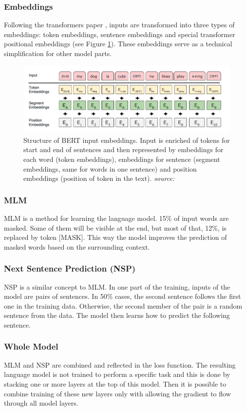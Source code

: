 \subsubsection{Embeddings}
Following the transformers paper \cite{vaswani1706attention},
inputs are transformed into three types of embeddings: token embeddings, sentence embeddings and special transformer positional embeddings (see Figure \ref{fig:bert_emb}). These embeddings serve as a technical simplification for other model parts.

\begin{figure}[H]
\centering
\includegraphics[width=1\textwidth]{diagrams/BERT-emb.png}
\caption{
Structure of BERT input embeddings. Input is enriched of tokens for start and end of sentences and then represented by embeddings for each word (token embeddings), embeddings for sentence (segment embeddings, same for words in one sentence) and position embeddings (position of token in the text).
\textit{source: \cite{bert}}}
\label{fig:bert_emb}
\end{figure}

\subsubsection{MLM}
MLM is a method for learning the language model. 15\% of input words are masked. Some of them will be visible at the end, but most of that, 12\%, is replaced by token [MASK].
This way the model improves the prediction of masked words based on the surrounding context.
\subsubsection{Next Sentence Prediction (NSP)}
NSP is a similar concept to MLM. In one part of the training, inputs of the model are pairs of sentences. In 50\% cases, the second sentence follows the first one in the training data. Otherwise, the second member of the pair is a random sentence from the data. The model then learns how to predict the following sentence.

\subsubsection{Whole Model}
MLM and NSP are combined and reflected in the loss function. The resulting language model is not trained to perform a specific task and this is done by stacking one or more layers at the top of this model. Then it is possible to combine training of these new layers only with allowing the gradient to flow through all model layers.

